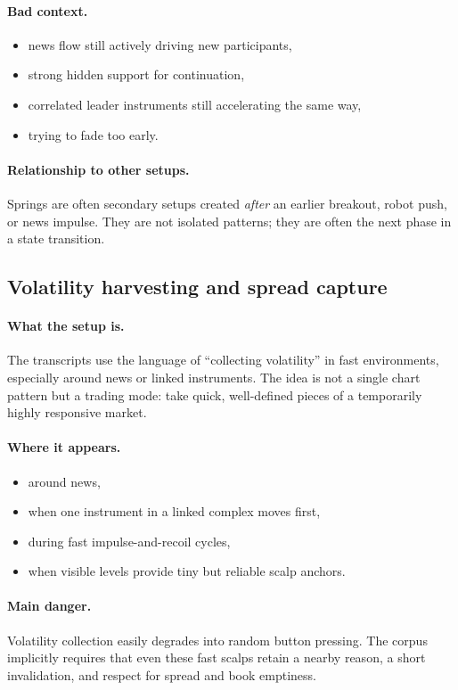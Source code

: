 \paragraph{Bad context.}
\begin{itemize}
\item news flow still actively driving new participants,
\item strong hidden support for continuation,
\item correlated leader instruments still accelerating the same way,
\item trying to fade too early.
\end{itemize}

\paragraph{Relationship to other setups.} Springs are often secondary setups created \emph{after} an earlier breakout, robot push, or news impulse. They are not isolated patterns; they are often the next phase in a state transition.

\subsection{Volatility harvesting and spread capture}

\paragraph{What the setup is.} The transcripts use the language of ``collecting volatility'' in fast environments, especially around news or linked instruments. The idea is not a single chart pattern but a trading mode: take quick, well-defined pieces of a temporarily highly responsive market.

\paragraph{Where it appears.}
\begin{itemize}
\item around news,
\item when one instrument in a linked complex moves first,
\item during fast impulse-and-recoil cycles,
\item when visible levels provide tiny but reliable scalp anchors.
\end{itemize}

\paragraph{Main danger.} Volatility collection easily degrades into random button pressing. The corpus implicitly requires that even these fast scalps retain a nearby reason, a short invalidation, and respect for spread and book emptiness.

